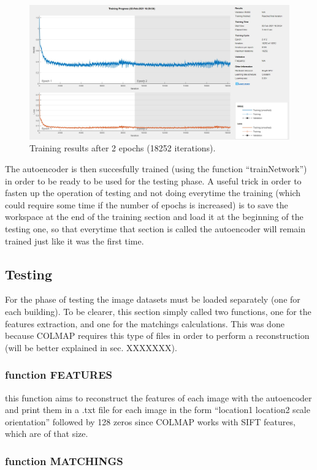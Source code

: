 \begin{figure}[H]
    \centering
    \includegraphics[width=\textwidth]{images/2EPOCHS.jpg}
    \caption{Training results after 2 epochs (18252 iterations).}
    \label{fig:2epochs}    
\end{figure}

The autoencoder is then succesfully trained (using the function ``trainNetwork'') in order to be ready to be used for the testing phase. A useful trick in order to fasten up the operation of testing and not doing everytime the training (which could require some time if the number of epochs is increased) is to save the workspace at the end of the training section and load it at the beginning of the testing one, so that everytime that section is called the autoencoder will remain trained just like it was the first time.

\subsection{Testing}
For the phase of testing the image datasets must be loaded separately (one for each building). To be clearer, this section simply called two functions, one for the features extraction, and one for the matchings calculations. This was done because COLMAP requires this type of files in order to perform a reconstruction (will be better explained in sec. XXXXXXX).

\subsubsection{function FEATURES}
this function aims to reconstruct the features of each image with the autoencoder and print them in a .txt file for each image in the form ``location1 location2 scale orientation'' followed by 128 zeros since COLMAP works with SIFT features, which are of that size.

\subsubsection{function MATCHINGS}